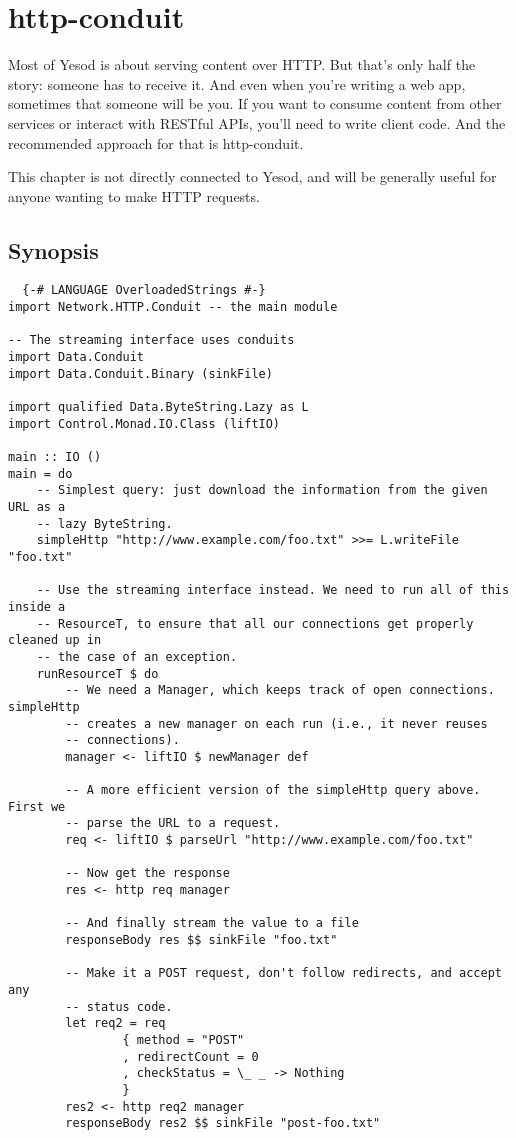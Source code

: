 \chapter{http-conduit}

Most of Yesod is about serving content over HTTP. But that's only half
the story: someone has to receive it. And even when you're writing a
web app, sometimes that someone will be you. If you want to consume
content from other services or interact with RESTful APIs, you'll need
to write client code. And the recommended approach for that is
http-conduit.

This chapter is not directly connected to Yesod, and will be generally
useful for anyone wanting to make HTTP requests.

\section{Synopsis}
\begin{lstlisting}
  {-# LANGUAGE OverloadedStrings #-}
import Network.HTTP.Conduit -- the main module

-- The streaming interface uses conduits
import Data.Conduit
import Data.Conduit.Binary (sinkFile)

import qualified Data.ByteString.Lazy as L
import Control.Monad.IO.Class (liftIO)

main :: IO ()
main = do
    -- Simplest query: just download the information from the given URL as a
    -- lazy ByteString.
    simpleHttp "http://www.example.com/foo.txt" >>= L.writeFile "foo.txt"

    -- Use the streaming interface instead. We need to run all of this inside a
    -- ResourceT, to ensure that all our connections get properly cleaned up in
    -- the case of an exception.
    runResourceT $ do
        -- We need a Manager, which keeps track of open connections. simpleHttp
        -- creates a new manager on each run (i.e., it never reuses
        -- connections).
        manager <- liftIO $ newManager def

        -- A more efficient version of the simpleHttp query above. First we
        -- parse the URL to a request.
        req <- liftIO $ parseUrl "http://www.example.com/foo.txt"

        -- Now get the response
        res <- http req manager

        -- And finally stream the value to a file
        responseBody res $$ sinkFile "foo.txt"

        -- Make it a POST request, don't follow redirects, and accept any
        -- status code.
        let req2 = req
                { method = "POST"
                , redirectCount = 0
                , checkStatus = \_ _ -> Nothing
                }
        res2 <- http req2 manager
        responseBody res2 $$ sinkFile "post-foo.txt"
\end{lstlisting} %

